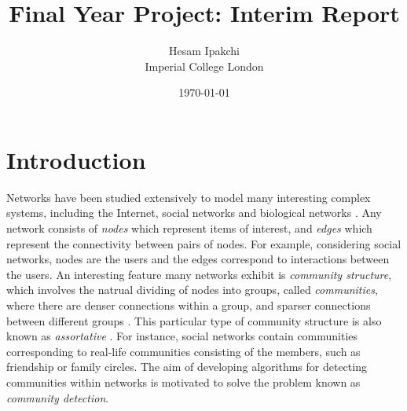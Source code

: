 \documentclass[12pt]{article}
\numberwithin{equation}{section}
\begin{document}
\nocite{*}


\title{\textbf{Final Year Project: Interim Report}}
\author{Hesam Ipakchi\\Imperial College London}
\date{\today}
\maketitle


\newpage
\thispagestyle{plain}
\mbox{}
\tableofcontents


\newpage
\thispagestyle{plain}
\mbox{}
\listoffigures


\newpage
\thispagestyle{plain}
\mbox{}
\section {Introduction}
\label{sec:introduction}

Networks have been studied extensively to model many interesting complex systems, including the Internet, social networks and biological networks \cite{New06a,DKM+13}. Any network consists of \textit{nodes} which represent items of interest, and \textit{edges} which represent the connectivity between pairs of nodes. For example, considering social networks, nodes are the users and the edges correspond to interactions between the users. An interesting feature many networks exhibit is \textit{community structure}, which involves the natrual dividing of nodes into groups, called \textit{communities}, where there are denser connections within a group, and sparser connections between different groups \cite{New06a,DKM+13,For10,New06b}. This particular type of community structure is also known as \textit{assortative} \cite{DKM+13}. For instance, social networks contain communities corresponding to real-life communities consisting of the members, such as friendship or family circles. The aim of developing algorithms for detecting communities within networks is motivated to solve the problem known as \textsl{community detection}.
\end{document}
